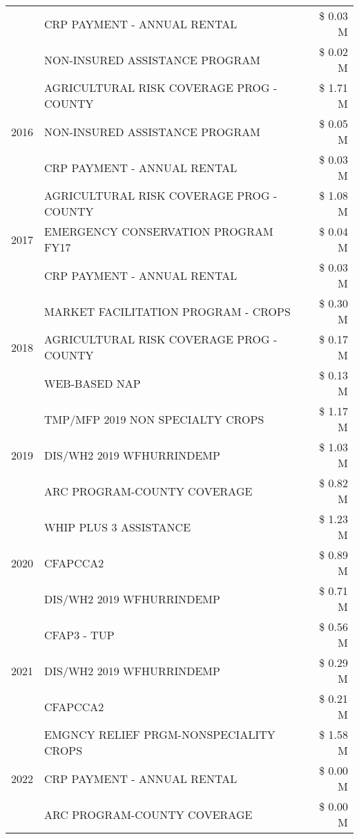 \begin{tabular}{llr}
 & CRP PAYMENT - ANNUAL RENTAL & \$ 0.03 M \\
 & NON-INSURED ASSISTANCE PROGRAM & \$ 0.02 M \\
\cline{1-3}
\multirow[t]{3}{*}{2016} & AGRICULTURAL RISK COVERAGE PROG - COUNTY & \$ 1.71 M \\
 & NON-INSURED ASSISTANCE PROGRAM & \$ 0.05 M \\
 & CRP PAYMENT - ANNUAL RENTAL & \$ 0.03 M \\
\cline{1-3}
\multirow[t]{3}{*}{2017} & AGRICULTURAL RISK COVERAGE PROG - COUNTY & \$ 1.08 M \\
 & EMERGENCY CONSERVATION PROGRAM FY17 & \$ 0.04 M \\
 & CRP PAYMENT - ANNUAL RENTAL & \$ 0.03 M \\
\cline{1-3}
\multirow[t]{3}{*}{2018} & MARKET FACILITATION PROGRAM - CROPS & \$ 0.30 M \\
 & AGRICULTURAL RISK COVERAGE PROG - COUNTY & \$ 0.17 M \\
 & WEB-BASED NAP & \$ 0.13 M \\
\cline{1-3}
\multirow[t]{3}{*}{2019} & TMP/MFP 2019 NON SPECIALTY CROPS & \$ 1.17 M \\
 & DIS/WH2 2019 WFHURRINDEMP & \$ 1.03 M \\
 & ARC PROGRAM-COUNTY COVERAGE & \$ 0.82 M \\
\cline{1-3}
\multirow[t]{3}{*}{2020} & WHIP PLUS 3 ASSISTANCE & \$ 1.23 M \\
 & CFAPCCA2 & \$ 0.89 M \\
 & DIS/WH2 2019 WFHURRINDEMP & \$ 0.71 M \\
\cline{1-3}
\multirow[t]{3}{*}{2021} & CFAP3 - TUP & \$ 0.56 M \\
 & DIS/WH2 2019 WFHURRINDEMP & \$ 0.29 M \\
 & CFAPCCA2 & \$ 0.21 M \\
\cline{1-3}
\multirow[t]{3}{*}{2022} & EMGNCY RELIEF PRGM-NONSPECIALITY CROPS & \$ 1.58 M \\
 & CRP PAYMENT - ANNUAL RENTAL & \$ 0.00 M \\
 & ARC PROGRAM-COUNTY COVERAGE & \$ 0.00 M \\
\cline{1-3}
\bottomrule
\end{tabular}
